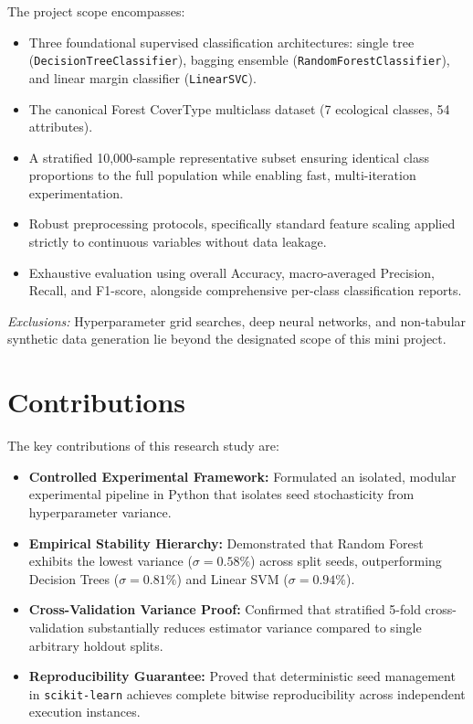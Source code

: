The project scope encompasses:
\begin{itemize}
    \item Three foundational supervised classification architectures: single tree (\texttt{DecisionTreeClassifier}), bagging ensemble (\texttt{RandomForestClassifier}), and linear margin classifier (\texttt{LinearSVC}).
    \item The canonical Forest CoverType multiclass dataset (7 ecological classes, 54 attributes).
    \item A stratified 10,000-sample representative subset ensuring identical class proportions to the full population while enabling fast, multi-iteration experimentation.
    \item Robust preprocessing protocols, specifically standard feature scaling applied strictly to continuous variables without data leakage.
    \item Exhaustive evaluation using overall Accuracy, macro-averaged Precision, Recall, and F1-score, alongside comprehensive per-class classification reports.
\end{itemize}

\textit{Exclusions:} Hyperparameter grid searches, deep neural networks, and non-tabular synthetic data generation lie beyond the designated scope of this mini project.

\section{Contributions}
\label{sec:contributions}

The key contributions of this research study are:
\begin{itemize}
    \item \textbf{Controlled Experimental Framework:} Formulated an isolated, modular experimental pipeline in Python that isolates seed stochasticity from hyperparameter variance.
    \item \textbf{Empirical Stability Hierarchy:} Demonstrated that Random Forest exhibits the lowest variance ($\sigma = 0.58\%$) across split seeds, outperforming Decision Trees ($\sigma = 0.81\%$) and Linear SVM ($\sigma = 0.94\%$).
    \item \textbf{Cross-Validation Variance Proof:} Confirmed that stratified 5-fold cross-validation substantially reduces estimator variance compared to single arbitrary holdout splits.
    \item \textbf{Reproducibility Guarantee:} Proved that deterministic seed management in \texttt{scikit-learn} achieves complete bitwise reproducibility across independent execution instances.
\end{itemize}

